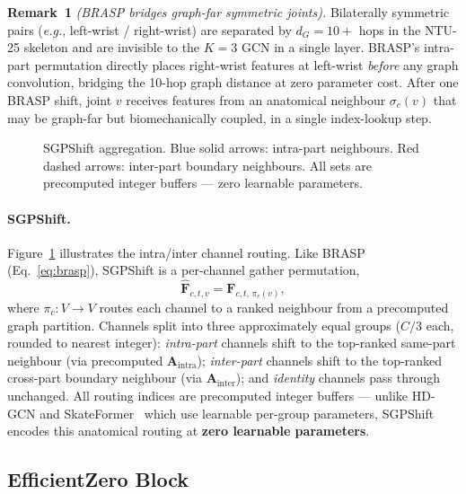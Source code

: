 \documentclass[sigconf,screen,review,anonymous]{acmart}
\newcommand{\eg}{\emph{e.g.}}
\begin{document}
\smallskip\noindent\textbf{Remark~1} \emph{(BRASP bridges graph-far symmetric joints).}
Bilaterally symmetric pairs (\eg, left-wrist / right-wrist) are separated
by $d_G{=}10{+}$ hops in the NTU-25 skeleton and are invisible to the
$K{=}3$ GCN in a single layer.
BRASP's intra-part permutation directly places right-wrist features at
left-wrist \emph{before} any graph convolution, bridging the 10-hop
graph distance at zero parameter cost.
After one BRASP shift, joint $v$ receives features from an anatomical
neighbour $\sigma_c(v)$ that may be graph-far but biomechanically coupled,
in a single index-lookup step.\smallskip

\begin{figure}[htpb]\vspace{-2mm}
\centering
\resizebox{\columnwidth}{!}{}
\caption{SGPShift aggregation. Blue solid arrows: intra-part neighbours.
  Red dashed arrows: inter-part boundary neighbours.
  All sets are precomputed integer buffers — zero learnable parameters.}
\label{fig:sgpshift}
\vspace{-3mm}\end{figure}

\paragraph{SGPShift.}
Figure~\ref{fig:sgpshift} illustrates the intra/inter channel routing.
Like BRASP (Eq.~\ref{eq:brasp}), SGPShift is a per-channel gather permutation,
\begin{equation}
  \hat{\mathbf{F}}_{c,t,v} = \mathbf{F}_{c,t,\,\pi_c(v)},
  \label{eq:sgp}
\end{equation}
where $\pi_c\!:\!V\!\to\!V$ routes each channel to a ranked neighbour
from a precomputed graph partition.
Channels split into three approximately equal groups ($C/3$ each, rounded to nearest integer): \emph{intra-part} channels
shift to the top-ranked same-part neighbour (via precomputed $\mathbf{A}_\text{intra}$);
\emph{inter-part} channels shift to the top-ranked cross-part boundary neighbour
(via $\mathbf{A}_\text{inter}$); and \emph{identity} channels pass through unchanged.
All routing indices are precomputed integer buffers ---
unlike HD-GCN and SkateFormer~\cite{hdgcn,skateformer} which use learnable per-group
parameters, SGPShift encodes this anatomical routing at \textbf{zero learnable parameters}.

\subsection{EfficientZero Block}\label{sec:block}
\end{document}
